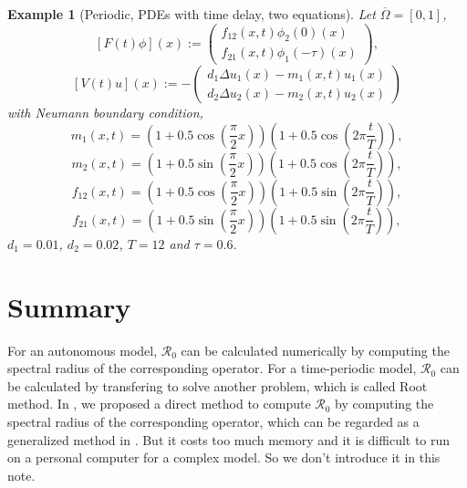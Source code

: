 \documentclass[12pt,reqno]{article}
\newtheorem{example}{Example}
\newcommand{\oOmega}{\overline{\Omega}}
\newcommand{\R}{\mathcal{R}_0}
\begin{document}
\begin{example}[Periodic, PDEs with time delay, two equations] Let $\oOmega=[0,1]$,
	$$[F(t) \phi](x) := 	\left(
	\begin{matrix}
	f_{12} (x,t) \phi_2(0)(x) \\
	f_{21} (x,t) \phi_1(-\tau)(x)
	\end{matrix}
	\right),$$
	$$[V(t) u](x) :=-	
	\left(
	\begin{matrix}
	d_1 \Delta u_1(x) - m_1(x,t) u_1(x) \\
	d_2 \Delta u_2(x) - m_2(x,t) u_2(x)
	\end{matrix}
	\right)$$ with Neumann boundary condition,
	$$m_1(x,t)=(1+0.5\cos(\frac{\pi}{2} x))(1+0.5\cos(2\pi \frac{t}{T})),$$
	$$m_2(x,t)=(1+0.5\sin(\frac{\pi}{2} x))(1+0.5\cos(2\pi \frac{t}{T})),$$
	$$f_{12}(x,t)=(1 +0.5 \cos(\frac{\pi}{2} x))(1+0.5\sin(2\pi \frac{t}{T})),$$
	$$f_{21}(x,t)=(1 +0.5 \sin(\frac{\pi}{2} x))(1+0.5\sin(2\pi \frac{t}{T})),$$
	$d_1=0.01$, $d_2=0.02$, $T=12$ and $\tau=0.6$.
\end{example}

\section{Summary}\label{sec:summary}

For an autonomous model, $\R$ can be calculated numerically by computing the spectral radius of the corresponding operator. For a time-periodic model, $\R$ can be calculated by transfering to solve another problem, which is called Root method. In \cite{yang2018remarks}, we proposed a direct method to compute $\R$ by computing the spectral radius of the corresponding operator, which can be regarded as a generalized method in \cite{posny2014computing}. But it costs too much memory and it is difficult to run on a personal computer for a complex model. So we don't introduce it in this note.
%
%
\end{document}
